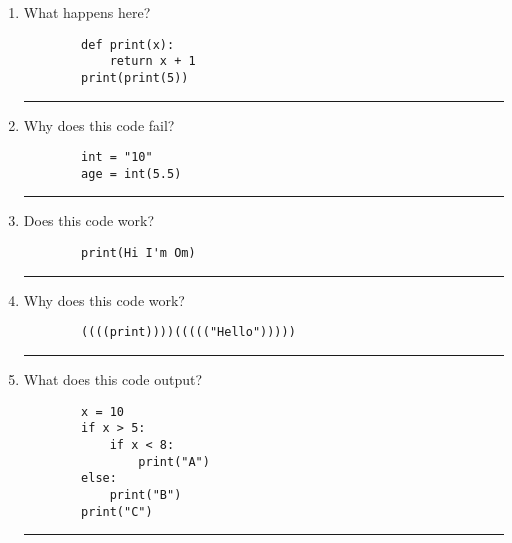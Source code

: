 \documentclass{article}
\begin{document}
\begin{multicols*}{2}
\begin{enumerate}
        \item What happens here?
        \begin{lstlisting}
        def print(x):
            return x + 1
        print(print(5))
        \end{lstlisting}
        \rule{\linewidth}{0.4pt} %

        \item Why does this code fail?
        \begin{lstlisting}
        int = "10"
        age = int(5.5)
        \end{lstlisting}
        \rule{\linewidth}{0.4pt} %

        \item Does this code work?
        \begin{lstlisting}
        print(Hi I'm Om)
        \end{lstlisting}
        \rule{\linewidth}{0.4pt} %

        \item Why does this code work?
        \begin{lstlisting}
        ((((print))))((((("Hello")))))
        \end{lstlisting}
        \rule{\linewidth}{0.4pt} %

        \item What does this code output?  
        \begin{lstlisting}
        x = 10
        if x > 5:
            if x < 8:
                print("A")
        else:
            print("B")
        print("C")
        \end{lstlisting}
        \rule{\linewidth}{0.4pt} %
    \end{enumerate}
\end{multicols*}
\end{document}
